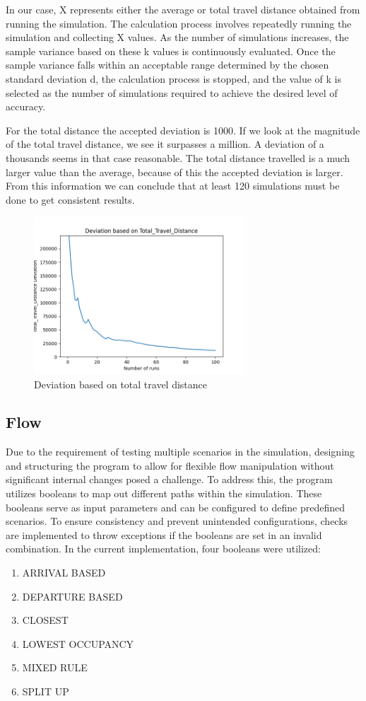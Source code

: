 \documentclass{article}
\begin{document}
In our case, X represents either the average or total travel distance obtained
from running the simulation. The calculation process involves repeatedly
running the simulation and collecting X values. As the number of simulations
increases, the sample variance based on these k values is continuously
evaluated. Once the sample variance falls within an acceptable range determined
by the chosen standard deviation d, the calculation process is stopped, and the
value of k is selected as the number of simulations required to achieve the
desired level of accuracy.

For the total distance the accepted deviation is 1000. If we look at the
magnitude of the total travel distance, we see it surpasses a million. A
deviation of a thousands seems in that case reasonable. The total distance
travelled is a much larger value than the average, because of this the accepted
deviation is larger. From this information we can conclude that at least 120
simulations must be done to get consistent results.

\begin{figure}[h]
    \centering
    \includegraphics[width=0.7\textwidth]{fig/calcruns.png}
    \caption{Deviation based on total travel distance}\label{fig:amount_of_runs}
\end{figure}

\subsection{Flow}
Due to the requirement of testing multiple scenarios in the simulation,
designing and structuring the program to allow for flexible flow manipulation
without significant internal changes posed a challenge. To address this, the
program utilizes booleans to map out different paths within the simulation.
These booleans serve as input parameters and can be configured to define
predefined scenarios. To ensure consistency and prevent unintended
configurations, checks are implemented to throw exceptions if the booleans are
set in an invalid combination. In the current implementation, four booleans
were utilized:
\begin{enumerate}
    \item ARRIVAL BASED
    \item DEPARTURE BASED
    \item CLOSEST
    \item LOWEST OCCUPANCY
    \item MIXED RULE
    \item SPLIT UP
\end{enumerate}
\end{document}
